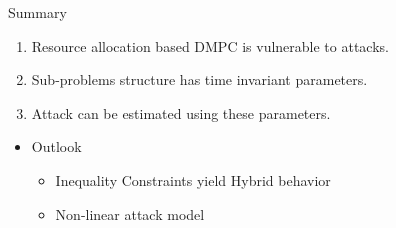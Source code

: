 \documentclass[aspectratio=169]{beamer}
\newcommand{\1}{\mathbf{1}}
\newcommand{\0}{\mathbf{0}}
\begin{document}
\begin{frame}{Summary}
  \pause
  \begin{minipage}[t]{.45\textwidth}
    \begin{enumerate}
      \item
            Resource allocation based DMPC is vulnerable to attacks.
            \pause
      \item
            Sub-problems structure has time invariant parameters.
            \pause
      \item
            Attack can be estimated using these parameters.
            \pause
    \end{enumerate}
  \end{minipage}
  \pause
  \begin{minipage}[t]{.45\textwidth}
    \begin{itemize}
      \item Outlook
            \begin{itemize}
              \item
                    Inequality Constraints yield Hybrid behavior
              \item
                    Non-linear attack model
            \end{itemize}
    \end{itemize}
  \end{minipage}
\end{frame}


\nocite{VelardeEtAl2017a}
\end{document}
